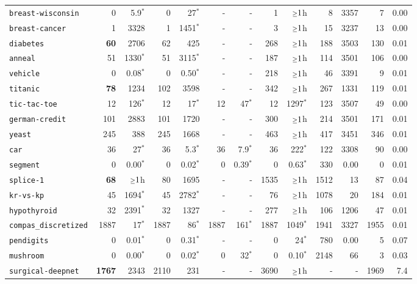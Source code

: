 \begin{tabular}{lrrrrrrrrrrrr}
\texttt{breast-wisconsin} & 0 & 5.9$^*$ & 0 & 27$^*$ & - & - & 1 & $\mathsmaller{\geq}1$h & 8 & 3357 & 7 & 0.00\\
\texttt{breast-cancer} & 1 & 3328 & 1 & 1451$^*$ & - & - & 3 & $\mathsmaller{\geq}1$h & 15 & 3237 & 13 & 0.00\\
\texttt{diabetes} & \textbf{60} & 2706 & 62 & 425 & - & - & 268 & $\mathsmaller{\geq}1$h & 188 & 3503 & 130 & 0.01\\
\texttt{anneal} & 51 & 1330$^*$ & 51 & 3115$^*$ & - & - & 187 & $\mathsmaller{\geq}1$h & 114 & 3501 & 106 & 0.00\\
\texttt{vehicle} & 0 & 0.08$^*$ & 0 & 0.50$^*$ & - & - & 218 & $\mathsmaller{\geq}1$h & 46 & 3391 & 9 & 0.01\\
\texttt{titanic} & \textbf{78} & 1234 & 102 & 3598 & - & - & 342 & $\mathsmaller{\geq}1$h & 267 & 1331 & 119 & 0.01\\
\texttt{tic-tac-toe} & 12 & 126$^*$ & 12 & 17$^*$ & 12 & 47$^*$ & 12 & 1297$^*$ & 123 & 3507 & 49 & 0.00\\
\texttt{german-credit} & 101 & 2883 & 101 & 1720 & - & - & 300 & $\mathsmaller{\geq}1$h & 214 & 3501 & 171 & 0.01\\
\texttt{yeast} & 245 & 388 & 245 & 1668 & - & - & 463 & $\mathsmaller{\geq}1$h & 417 & 3451 & 346 & 0.01\\
\texttt{car} & 36 & 27$^*$ & 36 & 5.3$^*$ & 36 & 7.9$^*$ & 36 & 222$^*$ & 122 & 3308 & 90 & 0.00\\
\texttt{segment} & 0 & 0.00$^*$ & 0 & 0.02$^*$ & 0 & 0.39$^*$ & 0 & 0.63$^*$ & 330 & 0.00 & 0 & 0.01\\
\texttt{splice-1} & \textbf{68} & $\mathsmaller{\geq}1$h & 80 & 1695 & - & - & 1535 & $\mathsmaller{\geq}1$h & 1512 & 13 & 87 & 0.04\\
\texttt{kr-vs-kp} & 45 & 1694$^*$ & 45 & 2782$^*$ & - & - & 76 & $\mathsmaller{\geq}1$h & 1078 & 20 & 184 & 0.01\\
\texttt{hypothyroid} & 32 & 2391$^*$ & 32 & 1327 & - & - & 277 & $\mathsmaller{\geq}1$h & 106 & 1206 & 47 & 0.01\\
\texttt{compas\_discretized} & 1887 & 17$^*$ & 1887 & 86$^*$ & 1887 & 161$^*$ & 1887 & 1049$^*$ & 1941 & 3327 & 1955 & 0.01\\
\texttt{pendigits} & 0 & 0.01$^*$ & 0 & 0.31$^*$ & - & - & 0 & 24$^*$ & 780 & 0.00 & 5 & 0.07\\
\texttt{mushroom} & 0 & 0.00$^*$ & 0 & 0.02$^*$ & 0 & 32$^*$ & 0 & 0.10$^*$ & 2148 & 66 & 3 & 0.03\\
\texttt{surgical-deepnet} & \textbf{1767} & 2343 & 2110 & 231 & - & - & 3690 & $\mathsmaller{\geq}1$h & - & - & 1969 & 7.4\\

\end{tabular}
